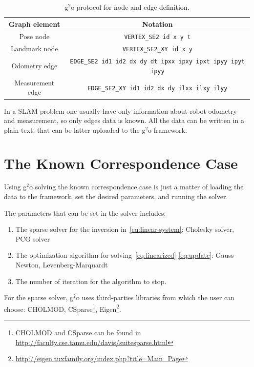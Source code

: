 \begin{table}[htbp!]
    \centering
    \begin{tabular}{|c|c|}
        \hline
        Graph element & Notation\\
        \hline
        Pose node & \texttt{VERTEX\_SE2 id x y t}\\
        Landmark node & \texttt{VERTEX\_SE2\_XY id x y}\\
        Odometry edge & \texttt{EDGE\_SE2 id1 id2 dx dy dt ipxx ipxy ipxt ipyy ipyt ipyy}\\
        Measurement edge & \texttt{EDGE\_SE2\_XY id1 id2 dx dy ilxx ilxy ilyy}\\
        \hline
    \end{tabular}
    \caption{g$^2$o protocol for node and edge definition.}
    \label{tab:protocol}
\end{table}

In a SLAM problem one usually have only information about robot odometry and measurement, so only edges data is known. All the data can be written in a plain text, that can be latter uploaded to the g$^2$o framework.

\section{The Known Correspondence Case}

Using g$^2$o solving the known correspondence case is just a matter of loading the data to the framework, set the desired parameters, and running the solver. 

The parameters that can be set in the solver includes: 

\begin{enumerate}
    \item The sparse solver for the inversion in~\eqref{eq:linear-system}: Cholesky solver, PCG solver
    \item The optimization algorithm for solving~\eqref{eq:linearized}-\eqref{eq:update}: Gauss-Newton, Levenberg-Marquardt
    \item The number of iteration for the algorithm to stop.
\end{enumerate}

For the sparse solver, g$^2$o uses third-parties libraries from which the user can choose: CHOLMOD, CSparse\footnote{CHOLMOD and CSparse can be found in \url{http://faculty.cse.tamu.edu/davis/suitesparse.html}}, Eigen\footnote{\url{http://eigen.tuxfamily.org/index.php?title=Main_Page}}. 

